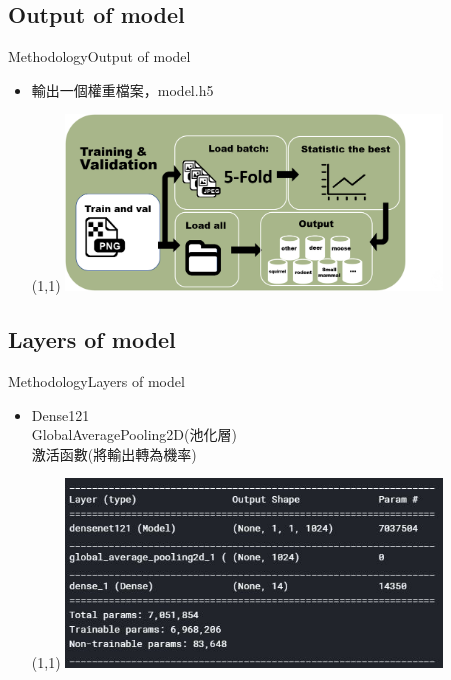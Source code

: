 \documentclass{beamer}
\begin{document}
\begin{CJK}{UTF8}{}
\subsection{Output of model}

\begin{frame}{Methodology}{Output of model}
\vspace{-4.5cm}
	\begin{itemize}
	\item{
		輸出一個權重檔案，model.h5
		\begin{textblock}{3}(1,1)
		\includegraphics[width=10cm]{output.png}
		\end{textblock}
	}
	\end{itemize}
\end{frame}

\subsection{Layers of model}

\begin{frame}{Methodology}{Layers of model}
\vspace{-4.5cm}
	\begin{itemize}
	\item{
		Dense121\\
		GlobalAveragePooling2D(池化層)\\
		激活函數(將輸出轉為機率)\\
		\begin{textblock}{3}(1,1)
		\includegraphics[width=10cm]{file_size_of_model.png}
		\end{textblock}
	}
	\end{itemize}
\end{frame}


\end{CJK}
\end{document}
